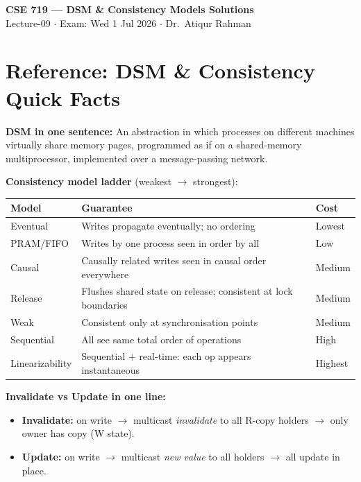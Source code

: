 \documentclass[12pt,a4paper]{article}
\begin{document}
\begin{center}
  {\Large\bfseries CSE 719 --- DSM \& Consistency Models Solutions}\\[4pt]
  {\normalsize Lecture-09 $\cdot$ Exam: Wed 1 Jul 2026 $\cdot$ Dr.\ Atiqur Rahman}
\end{center}

\tableofcontents
\newpage

\section{Reference: DSM \& Consistency Quick Facts}

\textbf{DSM in one sentence:} An abstraction in which processes on different machines virtually share memory pages, programmed as if on a shared-memory multiprocessor, implemented over a message-passing network.

\textbf{Consistency model ladder} (weakest $\to$ strongest):
\begin{center}
\begin{tabular}{@{}lll@{}}
\toprule
Model & Guarantee & Cost \\
\midrule
Eventual & Writes propagate eventually; no ordering & Lowest \\
PRAM/FIFO & Writes by one process seen in order by all & Low \\
Causal & Causally related writes seen in causal order everywhere & Medium \\
Release & Flushes shared state on release; consistent at lock boundaries & Medium \\
Weak & Consistent only at synchronisation points & Medium \\
Sequential & All see same total order of operations & High \\
Linearizability & Sequential + real-time: each op appears instantaneous & Highest \\
\bottomrule
\end{tabular}
\end{center}

\textbf{Invalidate vs Update in one line:}
\begin{itemize}[noitemsep]
  \item \textbf{Invalidate:} on write $\to$ multicast \emph{invalidate} to all R-copy holders $\to$ only owner has copy (W state).
  \item \textbf{Update:} on write $\to$ multicast \emph{new value} to all holders $\to$ all update in place.
\end{itemize}
\end{document}
